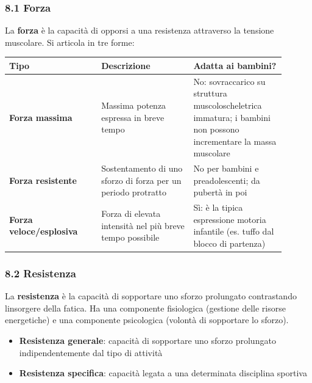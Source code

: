 \documentclass[a4paper,11pt]{article}
\providecommand{\tightlist}{%
  \setlength{\itemsep}{0pt}\setlength{\parskip}{0pt}}
\begin{document}
\subsubsection{8.1 Forza}\label{forza-1}

La \textbf{forza} è la capacità di opporsi a una resistenza attraverso
la tensione muscolare. Si articola in tre forme:

\begin{longtable}[]{@{}p{0.30\linewidth}p{0.30\linewidth}p{0.30\linewidth}@{}}
      \toprule\noalign{}
      Tipo                            & Descrizione                                    & Adatta ai bambini? \\
      \midrule\noalign{}
      \endhead
      \bottomrule\noalign{}
      \endlastfoot
      \textbf{Forza massima}          & Massima potenza espressa in breve tempo        & No:
      sovraccarico su struttura muscoloscheletrica immatura; i bambini non
      possono incrementare la massa muscolare                                                               \\
      \textbf{Forza resistente}       & Sostentamento di uno sforzo di forza per un
      periodo protratto               & No per bambini e preadolescenti; da pubertà in
      poi                                                                                                   \\
      \textbf{Forza veloce/esplosiva} & Forza di elevata intensità nel più
      breve tempo possibile           & Sì: è la tipica espressione motoria infantile
      (es. tuffo dal blocco di partenza)                                                                    \\
\end{longtable}

\subsubsection{8.2 Resistenza}\label{resistenza-1}

La \textbf{resistenza} è la capacità di sopportare uno sforzo prolungato
contrastando l\textquotesingle insorgere della fatica. Ha una componente
fisiologica (gestione delle risorse energetiche) e una componente
psicologica (volontà di sopportare lo sforzo).

\begin{itemize}
      \tightlist
      \item
            \textbf{Resistenza generale}: capacità di sopportare uno sforzo
            prolungato indipendentemente dal tipo di attività
      \item
            \textbf{Resistenza specifica}: capacità legata a una determinata
            disciplina sportiva
\end{itemize}
\end{document}
